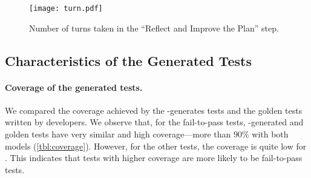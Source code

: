\begin{figure}[!htp]
    \centering
    \texttt{[image: turn.pdf]}
    \vspace{-10pt}
    \caption{Number of turns taken in the ``Reflect and Improve the Plan'' step.}
    \label{fig:turn}
\end{figure}


\subsection{Characteristics of the Generated Tests}
\label{sec:rq5}

\paragraph{Coverage of the generated tests.}

We compared the coverage achieved by the \solx-generates tests and the golden
tests written by developers. We observe that, for the fail-to-pass tests,
\solx-generated and golden tests have very similar and high coverage---more than
90\% with both models (\cref{tbl:coverage}). However, for the other tests, the
coverage is quite low for \solx. This indicates that tests with higher coverage
are more likely to be fail-to-pass tests.

\begin{table}[t]
\centering
\caption{Comparing the coverage of model-generated and developer-written tests.}
\vskip 0.05in
\label{tbl:coverage}
\end{table}







